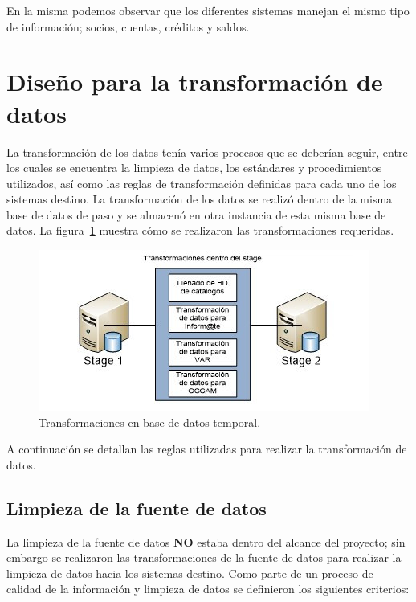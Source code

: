En la misma podemos observar que los diferentes sistemas manejan el mismo tipo
de información; socios, cuentas, créditos y saldos.

\section{Diseño para la transformación de datos}

La transformación de los datos tenía varios procesos que se deberían seguir,
entre los cuales se encuentra la limpieza de datos, los estándares y
procedimientos utilizados, así como las reglas de transformación definidas para
cada uno de los sistemas destino. La transformación de los datos se realizó
dentro de la misma base de datos de paso y se almacenó en otra instancia de esta
misma base de datos. La
figura~\ref{fig:transformaciones-en-base-de-datos-temporal} muestra cómo se
realizaron las transformaciones requeridas.

\begin{figure}[htb]
  \begin{center}
    \includegraphics[width=0.7\linewidth]{Transformaciones_stage.jpg}
    \caption{Transformaciones en base de datos temporal.}
    \label{fig:transformaciones-en-base-de-datos-temporal}
  \end{center}
\end{figure}

A continuación se detallan las reglas utilizadas para realizar la transformación
de datos.

\subsection{Limpieza de la fuente de datos}

La limpieza de la fuente de datos \textbf{NO} estaba dentro del alcance del
proyecto; sin embargo se realizaron las transformaciones de la fuente de datos
para realizar la limpieza de datos hacia los sistemas destino. Como parte de un
proceso de calidad de la información y limpieza de datos se definieron los
siguientes criterios:

